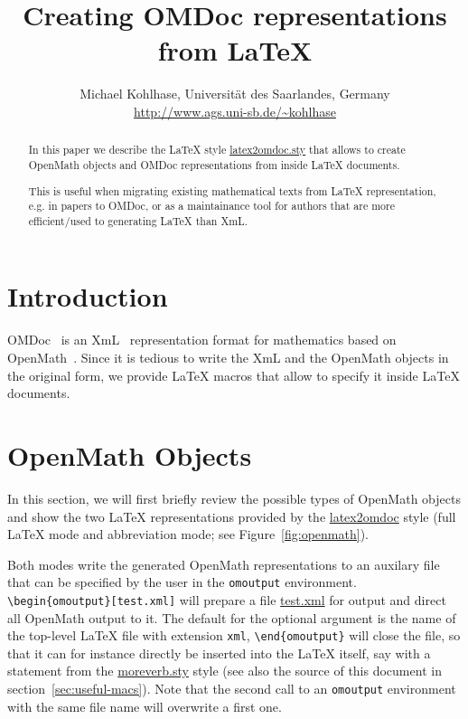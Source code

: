 \documentclass{article}
\def\xml{{\sc XmL}}
\def\openmath{{\sc OpenMath}}
\def\omdocname{{\sc OMDoc}}
\begin{document}
\title{Creating {\sc OMDoc} representations from {\LaTeX}}
\author{Michael Kohlhase, Universit\"at des Saarlandes, Germany\\
  \url{http://www.ags.uni-sb.de/~kohlhase}}
\maketitle
\begin{abstract}
  In this paper we describe the {\LaTeX} style {\url{latex2omdoc.sty}} that allows
  to create {\openmath} objects and {\omdocname} representations from inside
  {\LaTeX} documents.
  
  This is useful when migrating existing mathematical texts from {\LaTeX}
  representation, e.g. in papers to {\omdocname}, or as a maintainance tool for
  authors that are more efficient/used to generating {\LaTeX} than {\xml}.
\end{abstract}

\section{Introduction}
{\omdocname}~\cite{Kohlhase:otormd99} is an {\xml}~\cite{bray:XML97} representation
format for mathematics based on {\openmath}~\cite{CapCoh:doms98}.  Since it is
tedious to write the {\xml} and the {\openmath} objects in the original form, we
provide {\LaTeX} macros that allow to specify it inside {\LaTeX} documents.



\section{{\openmath} Objects}\label{sec:openmath}
In this section, we will first briefly review the possible types of {\openmath}
objects and show the two {\LaTeX} representations provided by the
{\url{latex2omdoc}} style (full {\LaTeX} mode and abbreviation mode; see
Figure~\ref{fig:openmath}).

Both modes write the generated {\openmath} representations to an auxilary file
that can be specified by the user in the {\tt omoutput} environment.
{\verb+\begin{omoutput}[test.xml]+} will prepare a file {\url{test.xml}} for
  output and direct all {\openmath} output to it. The default for the optional
  argument is the name of the top-level {\LaTeX} file with extension {\tt xml},
  {\verb+\end{omoutput}+} will close the file, so that it can for instance
directly be inserted into the {\LaTeX} itself, say with a {\verb++}
statement from the {\url{moreverb.sty}} style (see also the source of this
document in section~\ref{sec:useful-macs}). Note that the second call to an
{\tt omoutput} environment with the same file name will overwrite a first one.
\end{document}
